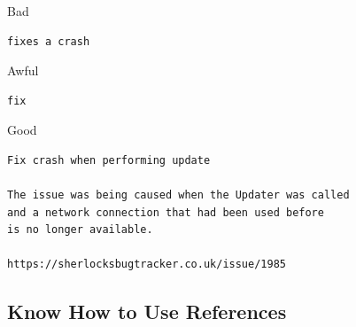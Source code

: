 
\begin{frame}[fragile]
  \frametitle{\insertsubsection}

  \begin{block}{\color{Red}Bad}

    \begin{footnotesize}
\begin{verbatim}
fixes a crash
\end{verbatim}
    \end{footnotesize}

  \end{block}

  \begin{block}{\color{Red}Awful}

    \begin{footnotesize}
\begin{verbatim}
fix
\end{verbatim}
    \end{footnotesize}

  \end{block}

\vspace{20pt}
  \begin{block}{\color{LimeGreen}Good}

    \begin{footnotesize}
\begin{verbatim}
Fix crash when performing update

The issue was being caused when the Updater was called
and a network connection that had been used before
is no longer available.

https://sherlocksbugtracker.co.uk/issue/1985
\end{verbatim}
    \end{footnotesize}
  \end{block}

\end{frame}


\subsection{Know How to Use References}

\begin{frame}
  \begin{center}
    \Huge{\textbf{\insertsubsection}}
  \end{center}
\end{frame}

